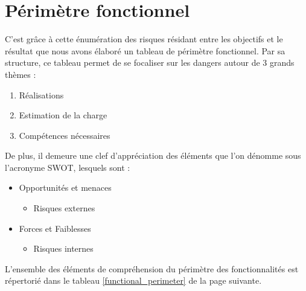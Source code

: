 \documentclass[12pt]{article}
\begin{document}
\section{Périmètre fonctionnel}
C’est grâce à cette énumération des risques résidant entre les objectifs et le résultat que nous avons élaboré un tableau de périmètre fonctionnel.
Par sa structure, ce tableau permet de se focaliser sur les dangers autour de 3 grands thèmes :
\begin{enumerate}
	\item Réalisations
	\item Estimation de la charge
	\item Compétences nécessaires
\end{enumerate}

De plus, il demeure une clef d’appréciation des éléments que l’on dénomme sous l’acronyme SWOT, lesquels sont :
\begin{itemize}
	\item Opportunités et menaces
	\begin{itemize}
		\item Risques externes
	\end{itemize}
	\item Forces et Faiblesses
	\begin{itemize}
		\item Risques internes
	\end{itemize}
\end{itemize}

L’ensemble des éléments de compréhension du périmètre des fonctionnalités est répertorié dans le tableau \ref{functional_perimeter} de la page suivante.
\end{document}
